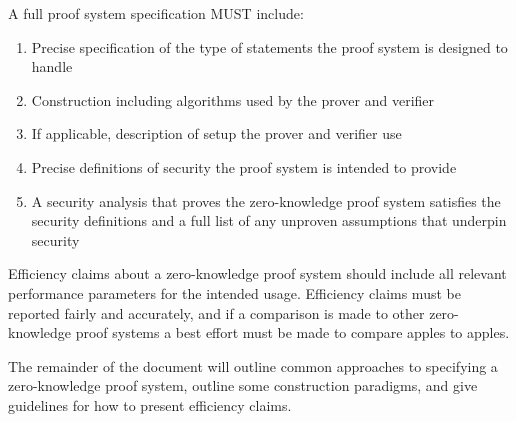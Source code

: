A full proof system specification MUST include:
\begin{enumerate}
\item Precise specification of the type of statements the proof system is designed to handle
\item Construction including algorithms used by the prover and verifier
\item If applicable, description of setup the prover and verifier use
\item Precise definitions of security the proof system is intended to provide
\item A security analysis that proves the zero-knowledge proof system satisfies the security definitions and a full list of any unproven assumptions that underpin security
\end{enumerate}

Efficiency claims about a zero-knowledge proof system should include all relevant performance parameters for the intended usage.
Efficiency claims must be reported fairly and accurately, and if a comparison is made to other zero-knowledge proof systems a best effort must be made to compare apples to apples.

The remainder of the document will outline common approaches to specifying 
a %
zero-knowledge proof system, outline some construction paradigms, and give guidelines for how to present efficiency claims.
\loosen


